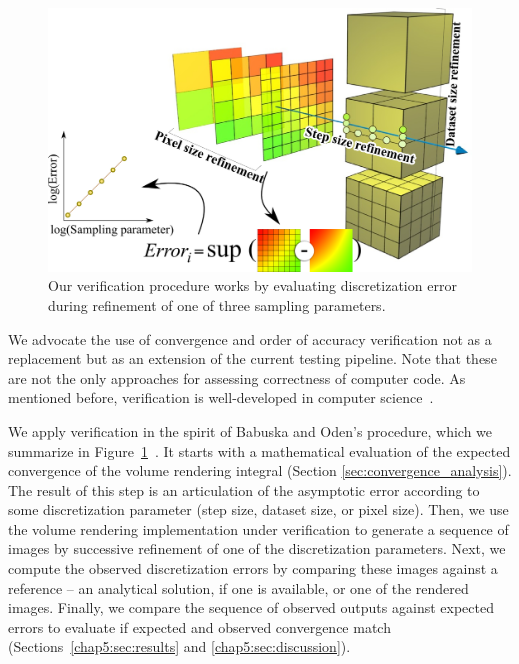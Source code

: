 %
\begin{figure}[t]
\centering
\includegraphics[width=0.8\linewidth]{chapter5/figures/refinement.png}
\caption{\label{fig:verification-procedure} Our verification procedure
  works by evaluating discretization error during refinement
  of one of three sampling parameters.%
  }
\end{figure}
%
We advocate the use of convergence and order of accuracy verification
not as a replacement but as an extension of the current testing
pipeline.  
Note that these are not the only approaches for assessing correctness
of computer code. As mentioned before, verification is well-developed
in computer science~\cite{Clarke08,FLO67,godefroid08,
  Yang:2006:UMC:1189256.1189259}. 


We apply verification in the spirit of Babuska and Oden's procedure,
which we summarize in
Figure~\ref{fig:verification-procedure}~\cite{babuska04}. It starts
with a mathematical evaluation of the expected convergence of the
volume rendering integral (Section
\ref{sec:convergence_analysis}). The result of this step is an articulation of the
asymptotic error according to some discretization parameter (step
size, dataset size, or pixel size). Then, we use the volume rendering
implementation under verification to generate a sequence of images by
successive refinement of one of the discretization parameters. Next,
we compute the observed discretization errors by comparing these
images against a reference -- an analytical solution, if one is
available, or one of the rendered images. Finally, we compare the
sequence of observed outputs against expected errors to evaluate if expected
and observed convergence match (Sections~\ref{chap5:sec:results} and
\ref{chap5:sec:discussion}).  

